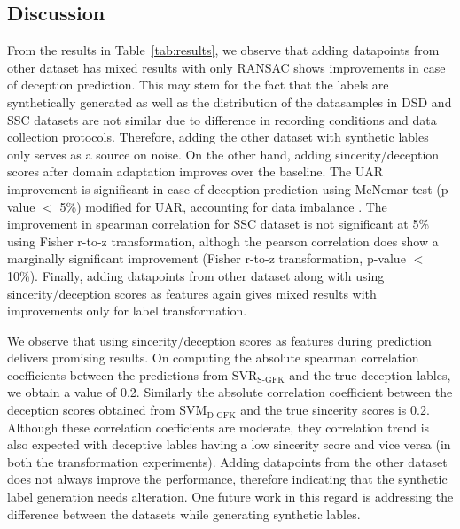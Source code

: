 \documentclass{article}
\begin{document}
\subsection{Discussion}
From the results in Table~\ref{tab:results}, we observe that adding datapoints from other dataset has mixed results with only RANSAC shows improvements in case of deception prediction.
This may stem for the fact that the labels are synthetically generated as well as the distribution of the datasamples in DSD and SSC datasets are not similar due to difference in recording conditions and data collection protocols. 
Therefore, adding the other dataset with synthetic lables only serves as a source on noise.
On the other hand, adding sincerity/deception scores after domain adaptation improves over the baseline. 
The UAR improvement is significant in case of deception prediction using McNemar test (p-value $<$ 5\%) modified for UAR, accounting for data imbalance \cite{}.
The improvement in spearman correlation for SSC dataset is not significant at 5\% using Fisher r-to-z transformation, althogh the pearson correlation does show a marginally significant improvement (Fisher r-to-z transformation, p-value $<$ 10\%). 
Finally, adding datapoints from other dataset along with using sincerity/deception scores as features again gives mixed results with improvements only for label transformation. 

We observe that using sincerity/deception scores as features during prediction delivers promising results.
On computing the absolute spearman correlation coefficients between the predictions from SVR$_\text{S-GFK}$ and the true deception lables, we obtain a value of 0.2.
Similarly the absolute correlation coefficient between the deception scores obtained from SVM$_\text{D-GFK}$ and the true sincerity scores is 0.2.
Although these correlation coefficients are moderate, they correlation trend is also expected with deceptive lables having a low sincerity score and vice versa (in both the transformation experiments).  
Adding datapoints from the other dataset does not always improve the performance, therefore indicating that the synthetic label generation needs alteration. 
One future work in this regard is addressing the difference between the datasets while generating synthetic lables. 
 
\end{document}

